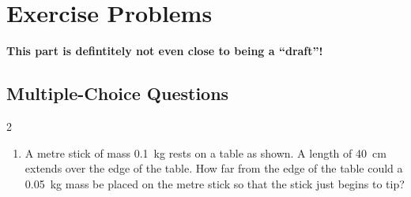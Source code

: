 %


\newpage

\section*{Exercise Problems}
\textbf{This part is defintitely not even close to being a ``draft''!}


\subsection*{Multiple-Choice Questions}{\footnotesize
  
  \begin{multicols}{2}
  
    \begin{enumerate}[leftmargin=12pt,itemsep=6pt]
    \item A metre stick of mass \SI{.1}{\kilo\gram} rests on a table as shown. A
      length of \SI{40}{\centi\metre} extends over the edge of the table. How
      far from the edge of the table could a \SI{.05}{\kilo\gram} mass be
      placed on the metre stick so that the stick just begins to tip?
      \begin{center}
      \end{center}
      

\end{enumerate}
\end{multicols}}
